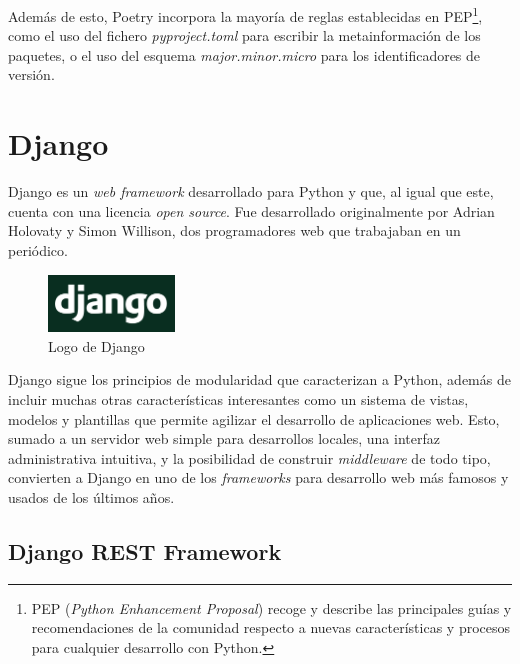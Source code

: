 Además de esto, Poetry incorpora la mayoría de reglas establecidas en PEP\footnote{PEP (\emph{Python Enhancement Proposal}) recoge y describe las principales guías y recomendaciones de la comunidad respecto a nuevas características y procesos para cualquier desarrollo con Python.}, como el uso del fichero \emph{pyproject.toml} para escribir la metainformación de los paquetes, o el uso del esquema \emph{major.minor.micro} para los identificadores de versión. \emph{\parencite{Reference6}}


\section{Django}\label{sec:django}

Django es un \emph{web framework} desarrollado para Python y que, al igual que este, cuenta con una licencia \emph{open source}. Fue desarrollado originalmente por Adrian Holovaty y Simon Willison, dos programadores web que trabajaban en un periódico. \emph{\parencite{Reference4}}

\begin{figure}[ht]
    \centering
    \includegraphics[width=0.3\textwidth]{Figures/django-logo}
    \decoRule
    \caption[Django (Logo)]{Logo de Django \emph{\parencite{Reference5}}}
    \label{fig:django-logo}
\end{figure}

Django sigue los principios de modularidad que caracterizan a Python, además de incluir muchas otras características interesantes como un sistema de vistas, modelos y plantillas que permite agilizar el desarrollo de aplicaciones web. Esto, sumado a un servidor web simple para desarrollos locales, una interfaz administrativa intuitiva, y la posibilidad de construir \emph{middleware} de todo tipo, convierten a Django en uno de los \emph{frameworks} para desarrollo web más famosos y usados de los últimos años. \emph{\parencite{Reference4}}

\subsection{Django REST Framework}

